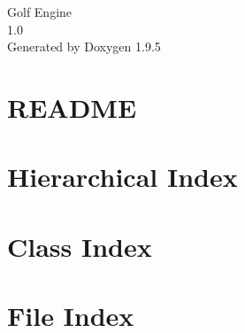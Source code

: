 \documentclass[twoside]{book}
\newcommand{\+}{\discretionary{\mbox{\scriptsize$\hookleftarrow$}}{}{}}
\newcommand{\clearemptydoublepage}{%
    \newpage{\pagestyle{empty}\cleardoublepage}%
  }
\begin{document}
  \raggedbottom
    \hypersetup{pageanchor=false,
                bookmarksnumbered=true,
                pdfencoding=unicode
               }
  \begin{titlepage}
  \vspace*{7cm}
  \begin{center}%
  {\Large Golf Engine}\\
  [1ex]\large 1.\+0 \\
  \vspace*{1cm}
  {\large Generated by Doxygen 1.9.5}\\
  \end{center}
  \end{titlepage}
  \clearemptydoublepage
  \tableofcontents
  \clearemptydoublepage
  \hypersetup{pageanchor=true}
\chapter{README}
\label{md__d___avans__jaar4__minor_s_p_c__s_p_c__project_src__r_e_a_d_m_e}

\chapter{Hierarchical Index}

\chapter{Class Index}

\chapter{File Index}

\end{document}
